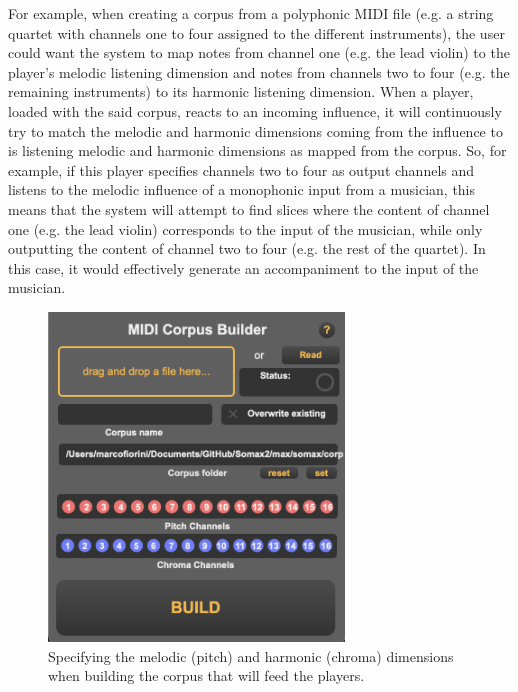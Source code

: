 For example, when creating a corpus from a polyphonic MIDI file (e.g. a string quartet with channels one to four assigned to the different instruments), the user could want the system to map notes from channel one (e.g. the lead violin) to the player's melodic listening dimension and notes from channels two to four (e.g. the remaining instruments) to its harmonic listening dimension. When a player, loaded with the said corpus, reacts to an incoming influence, it will continuously try to match the melodic and harmonic dimensions coming from the influence to is listening melodic and harmonic dimensions as mapped from the corpus. So, for example, if this player specifies channels two to four as output channels and listens to the melodic influence of a monophonic input from a musician, this  means that the system will attempt to find slices where the content of channel one (e.g. the lead violin) corresponds to the input of the musician, while only outputting the content of channel two to four (e.g. the rest of the quartet). In this case, it would effectively generate an accompaniment to the input of the musician.

 \begin{figure}[h!]
    \centering        
 	\includegraphics[width=0.7\textwidth, keepaspectratio]{img/midicorpusbuilder.png}
    \caption{Specifying the melodic (pitch) and harmonic (chroma) dimensions when building the corpus that will feed the players.}
    \label{fig:myFig}
\end{figure}

